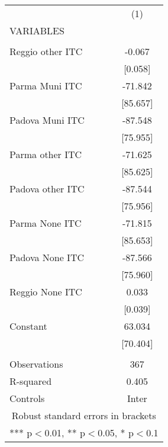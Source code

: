 \begin{tabular}{lc} \hline
 & (1) \\
VARIABLES &  \\ \hline
 &  \\
Reggio other ITC & -0.067 \\
 & [0.058] \\
Parma Muni ITC & -71.842 \\
 & [85.657] \\
Padova Muni ITC & -87.548 \\
 & [75.955] \\
Parma other ITC & -71.625 \\
 & [85.625] \\
Padova other ITC & -87.544 \\
 & [75.956] \\
Parma None ITC & -71.815 \\
 & [85.653] \\
Padova None ITC & -87.566 \\
 & [75.960] \\
Reggio None ITC & 0.033 \\
 & [0.039] \\
Constant & 63.034 \\
 & [70.404] \\
 &  \\
Observations & 367 \\
R-squared & 0.405 \\
 Controls & Inter \\ \hline
\multicolumn{2}{c}{ Robust standard errors in brackets} \\
\multicolumn{2}{c}{ *** p$<$0.01, ** p$<$0.05, * p$<$0.1} \\
\end{tabular}
